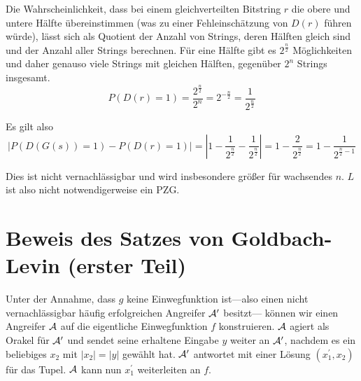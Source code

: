 \documentclass{../crypto}
\begin{document}
Die Wahrscheinlichkeit, dass bei einem gleichverteilten Bitstring $r$ die obere
und untere Hälfte übereinstimmen (was zu einer Fehleinschätzung von $D(r)$
führen würde), lässt sich als Quotient der Anzahl von Strings, deren Hälften
gleich sind und der Anzahl aller Strings berechnen. Für eine Hälfte gibt es
$2^{\frac{n}{2}}$ Möglichkeiten und daher genauso viele Strings mit gleichen
Hälften, gegenüber $2^n$ Strings insgesamt.
\begin{equation*}
   P(D(r) = 1) = \frac{2^{\frac{n}{2}}}{2^n} = 2^{-\frac{n}{2}} = \frac{1}{2^\frac{n}{2}}
\end{equation*}

Es gilt also 
\begin{equation*}
   \left\lvert P(D(G(s)) = 1) - P(D(r) = 1) \right\rvert = \left\lvert1 - \frac{1}{2^\frac{n}{2}} -
   \frac{1}{2^\frac{n}{2}}\right\rvert = 1 - \frac{2}{2^{\frac{n}{2}}} = 1 -
   \frac{1}{2^{\frac{n}{2} - 1}}
\end{equation*}

Dies ist nicht vernachlässigbar und wird insbesondere größer für wachsendes $n$.
$L$ ist also nicht notwendigerweise ein PZG.

\section{Beweis des Satzes von Goldbach-Levin (erster Teil)}

Unter der Annahme, dass $g$ keine Einwegfunktion ist---also einen nicht
vernachlässigbar häufig erfolgreichen Angreifer $\mathcal{A}^\prime$ besitzt---
können wir einen Angreifer $\mathcal{A}$ auf die eigentliche Einwegfunktion $f$
konstruieren. $\mathcal{A}$ agiert als Orakel für $\mathcal{A}^\prime$ und sendet
seine erhaltene Eingabe $y$ weiter an $\mathcal{A}^\prime$, nachdem es ein
beliebiges $x_2$ mit $|x_2| = |y|$ gewählt hat. $\mathcal{A}^\prime$
antwortet mit einer Lösung $(x_1^\prime,x_2)$ für das Tupel. $\mathcal{A}$ kann
nun $x_1^\prime$  weiterleiten an $f$. 

\begin{center}
\end{center}
\end{document}
